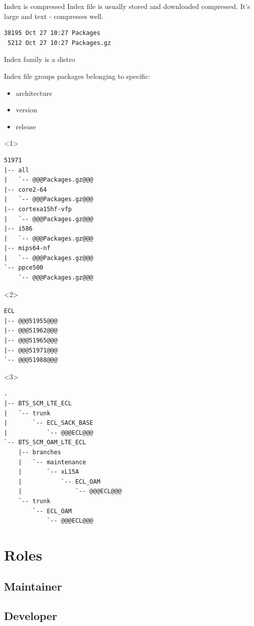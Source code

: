 \documentclass{beamer}
\begin{document}
\begin{frame}[fragile]{Index is compressed}
Index file is usually stored and downloaded compressed.
It's large and text - compresses well.
\begin{lstlisting}[style=Console]
38195 Oct 27 10:27 Packages
 5212 Oct 27 10:27 Packages.gz
\end{lstlisting}
\end{frame}

\begin{frame}[fragile, t]{Index family is a distro}
    \begin{block}{}
        Index file groups packages belonging to specific:
        \begin{itemize}
            \item<1-> architecture
            \item<2-> version
            \item<3-> release
        \end{itemize}
    \end{block}
\begin{onlyenv}<1>\begin{lstlisting}[style=TinyConsole]
51971
|-- all
|   `-- @@@Packages.gz@@@
|-- core2-64
|   `-- @@@Packages.gz@@@
|-- cortexa15hf-vfp
|   `-- @@@Packages.gz@@@
|-- i586
|   `-- @@@Packages.gz@@@
|-- mips64-nf
|   `-- @@@Packages.gz@@@
`-- ppce500
    `-- @@@Packages.gz@@@
\end{lstlisting}\end{onlyenv}
\begin{onlyenv}<2>\begin{lstlisting}[style=TinyConsole]
ECL
|-- @@@51955@@@
|-- @@@51962@@@
|-- @@@51965@@@
|-- @@@51971@@@
`-- @@@51988@@@
\end{lstlisting}\end{onlyenv}
\begin{onlyenv}<3>\begin{lstlisting}[style=TinyConsole]
.
|-- BTS_SCM_LTE_ECL
|   `-- trunk
|       `-- ECL_SACK_BASE
|           `-- @@@ECL@@@
`-- BTS_SCM_OAM_LTE_ECL
    |-- branches
    |   `-- maintenance
    |       `-- xL15A
    |           `-- ECL_OAM
    |               `-- @@@ECL@@@
    `-- trunk
        `-- ECL_OAM
            `-- @@@ECL@@@
\end{lstlisting}\end{onlyenv}
\end{frame}

\section{Roles}

\subsection{Maintainer}

\begin{frame}
\end{frame}

\subsection{Developer}

\begin{frame}
\end{frame}
\end{document}
